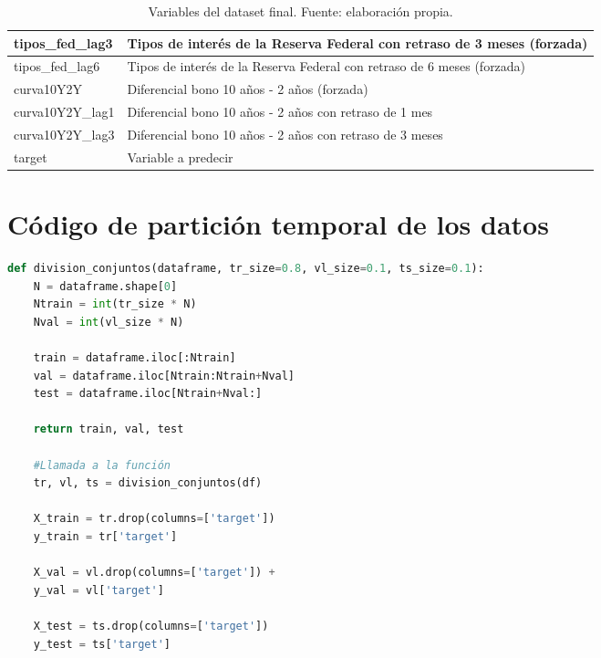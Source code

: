 \begin{table}[H]
\begin{tabular}{|p{5cm}|p{9.5cm}|}
\hline
tipos\_fed\_lag3 & Tipos de interés de la Reserva Federal con retraso de 3 meses (forzada) \\
\hline
tipos\_fed\_lag6 & Tipos de interés de la Reserva Federal con retraso de 6 meses (forzada) \\
\hline
curva10Y2Y & Diferencial bono 10 años - 2 años (forzada) \\
\hline
curva10Y2Y\_lag1 & Diferencial bono 10 años - 2 años con retraso de 1 mes \\
\hline
curva10Y2Y\_lag3 & Diferencial bono 10 años - 2 años con retraso de 3 meses \\
\hline
target & Variable a predecir \\
\hline
\end{tabular}
\label{tab:variables_dataset_finalml}
\caption{Variables del dataset final. Fuente: elaboración propia.}
\end{table}

\section{Código de partición temporal de los datos}
\label{sec:codigo_particion_datos}
\begin{lstlisting}[language=Python, caption=Función para la partición temporal de los datos, label=lst:split]
def division_conjuntos(dataframe, tr_size=0.8, vl_size=0.1, ts_size=0.1):
    N = dataframe.shape[0]
    Ntrain = int(tr_size * N)
    Nval = int(vl_size * N)
    
    train = dataframe.iloc[:Ntrain]
    val = dataframe.iloc[Ntrain:Ntrain+Nval]
    test = dataframe.iloc[Ntrain+Nval:]
    
    return train, val, test

    #Llamada a la función
    tr, vl, ts = division_conjuntos(df) 

    X_train = tr.drop(columns=['target']) 
    y_train = tr['target']

    X_val = vl.drop(columns=['target']) +
    y_val = vl['target']

    X_test = ts.drop(columns=['target']) 
    y_test = ts['target']
\end{lstlisting}

